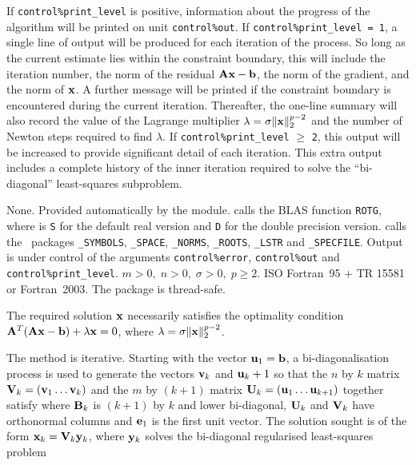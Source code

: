 \documentclass{galahad}
\newcommand{\packagename}{LS\-RT}
\begin{document}

\galinfo
If {\tt control\%print\_level} is positive, information about the progress 
of the algorithm will be printed on unit {\tt control\-\%\-out}.
If {\tt control\%print\_level = 1}, a single line of output will be produced  
for each iteration of the process. So long as the current estimate lies 
within the constraint boundary, this will include  
the iteration number, the norm of the residual ${\mathbf{A}}{\mathbf{x}}-{\mathbf{b}}$, the 
norm of the gradient, and the norm of ${\mathbf{x}}$.
A further message will be printed  
if the constraint boundary is encountered during the current iteration.  
Thereafter, the one-line summary will also record the value of the Lagrange
multiplier $\lambda = \sigma \|{\mathbf{x}}\|_2^{p-2}$
and the number of Newton steps required to find $\lambda$.
If {\tt control\%print\_level} $\geq$ {\tt 2}, this  
output will be increased to provide significant detail of each iteration.  
This extra output includes a complete history of the inner iteration required 
to solve the ``bi-diagonal'' least-squares subproblem.


\galgeneral

\galcommon None.
\galworkspace Provided automatically by the module.
\galroutines {\tt \packagename\_solve} calls the
BLAS function {\tt *ROTG}, where {\tt *} is {\tt S} for 
the default real version and {\tt D} for the double precision version.
\galmodules {\tt \packagename\_solve} calls the \galahad\ packages 
{\tt \libraryname\_SY\-M\-BOLS}, 
{\tt \libraryname\_SPACE}, 
{\tt \libraryname\_NORMS}, 
{\tt \libraryname\_\-ROOTS},
{\tt \libraryname\_LSTR} and
{\tt \libraryname\_SPECFILE}.
\galio Output is under control of the arguments 
{\tt control\%error}, {\tt control\%out} and {\tt control\%print\_level}.
\galrestrictions $m > 0, \; n  >  0, \;  \sigma  >  0, \; p \geq 2$. 
\galportability ISO Fortran~95 + TR 15581 or Fortran~2003.
The package is thread-safe.


\galmethod
The required solution ${\mathbf{x}}$ necessarily satisfies the optimality condition 
${\mathbf{A}}^T ( {\mathbf{A}} {\mathbf{x}} - {\mathbf{b}} ) + \lambda {\mathbf{x}} = 0$, where 
$\lambda = \sigma \|{\mathbf{x}}\|_2^{p-2}$.
 
\noindent 
The method is iterative. Starting  with the vector ${\mathbf{u}}_1 = {\mathbf{b}}$, a
bi-diagonalisation process is used to generate the vectors ${\mathbf{v}}_k$ and 
${\mathbf{u}}_k+1$ so that the $n$ by $k$ matrix ${\mathbf{V}}_k = ( {\mathbf{v}}_1 \ldots {\mathbf{v}}_k)$ 
and the $m$ by $(k+1)$ matrix ${\mathbf{U}}_k = ( {\mathbf{u}}_1 \ldots {\mathbf{u}}_{k+1})$ 
together satisfy
where ${\mathbf{B}}_k$ is $(k+1)$ by $k$ and lower bi-diagonal, ${\mathbf{U}}_k$ and 
${\mathbf{V}}_k$ have orthonormal columns and ${\mathbf{e}}_1$ is the first unit vector. 
The solution sought is of the form ${\mathbf{x}}_k = {\mathbf{V}}_k {\mathbf{y}}_k$, where ${\mathbf{y}}_k$
solves the bi-diagonal regularised least-squares problem
\end{document}
